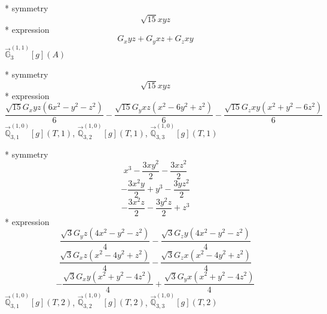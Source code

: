 \documentclass[fleqn,8pt]{jsarticle}
\begin{document}
\noindent\quad ** symmetry
\begin{dmath*}
\sqrt{15} x y z
\end{dmath*}
\noindent\quad ** expression
\begin{dmath*}
G_{x} y z + G_{y} x z + G_{z} x y
\end{dmath*}
\noindent\quad $\vec{\mathbb{G}}_{3}^{(1,1)}[g](A)$

\noindent\quad ** symmetry
\begin{dmath*}
\sqrt{15} x y z
\end{dmath*}
\noindent\quad ** expression
\begin{dmath*}
\frac{\sqrt{15} G_{x} y z \left(6 x^{2} - y^{2} - z^{2}\right)}{6} - \frac{\sqrt{15} G_{y} x z \left(x^{2} - 6 y^{2} + z^{2}\right)}{6} - \frac{\sqrt{15} G_{z} x y \left(x^{2} + y^{2} - 6 z^{2}\right)}{6}
\end{dmath*}
\noindent\quad $\vec{\mathbb{Q}}_{3,1}^{(1,0)}[g](T,1)$, $\vec{\mathbb{Q}}_{3,2}^{(1,0)}[g](T,1)$, $\vec{\mathbb{Q}}_{3,3}^{(1,0)}[g](T,1)$

\noindent\quad ** symmetry
\begin{dmath*}
x^{3} - \frac{3 x y^{2}}{2} - \frac{3 x z^{2}}{2}
\end{dmath*}
\begin{dmath*}
- \frac{3 x^{2} y}{2} + y^{3} - \frac{3 y z^{2}}{2}
\end{dmath*}
\begin{dmath*}
- \frac{3 x^{2} z}{2} - \frac{3 y^{2} z}{2} + z^{3}
\end{dmath*}
\noindent\quad ** expression
\begin{dmath*}
\frac{\sqrt{3} G_{y} z \left(4 x^{2} - y^{2} - z^{2}\right)}{4} - \frac{\sqrt{3} G_{z} y \left(4 x^{2} - y^{2} - z^{2}\right)}{4}
\end{dmath*}
\begin{dmath*}
\frac{\sqrt{3} G_{x} z \left(x^{2} - 4 y^{2} + z^{2}\right)}{4} - \frac{\sqrt{3} G_{z} x \left(x^{2} - 4 y^{2} + z^{2}\right)}{4}
\end{dmath*}
\begin{dmath*}
- \frac{\sqrt{3} G_{x} y \left(x^{2} + y^{2} - 4 z^{2}\right)}{4} + \frac{\sqrt{3} G_{y} x \left(x^{2} + y^{2} - 4 z^{2}\right)}{4}
\end{dmath*}
\noindent\quad $\vec{\mathbb{Q}}_{3,1}^{(1,0)}[g](T,2)$, $\vec{\mathbb{Q}}_{3,2}^{(1,0)}[g](T,2)$, $\vec{\mathbb{Q}}_{3,3}^{(1,0)}[g](T,2)$
\end{document}

